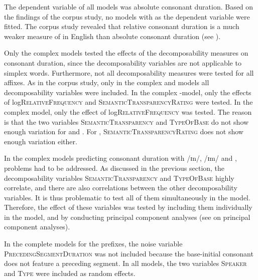 The dependent variable of all models was absolute consonant duration. Based on the findings of the corpus study, no models with  as the dependent variable were fitted.  The corpus study revealed that relative consonant duration is a much weaker measure of  in English than absolute consonant duration (see ).

Only the complex models tested the effects of the decomposability measures on consonant duration, since the decomposability variables are not applicable to simplex words.
Furthermore, not all decomposability measures were tested for all affixes. As in the corpus study, only in the complex   and models all decomposability variables were included. In the complex -model, only the effects of log\textsc{RelativeFrequency} and \textsc{SemanticTransparencyRating} were tested. In the complex model, only the effect of log\textsc{RelativeFrequency} was tested. The reason is that the two variables  \textsc{SemanticTransparency} and \textsc{TypeOfBase} do not show enough variation for  and . For , \textsc{SemanticTransparencyRating} does not show enough variation either.


In the complex models predicting consonant duration with /ɪn/, /ɪm/  and ,  problems had to be addressed. As discussed in the previous section, the decomposability variables \textsc{SemanticTransparency} and \textsc{TypeOfBase} highly correlate, and there are also correlations between the other decomposability variables. It is thus problematic to test all of them simultaneously in the model. Therefore, the effect of these variables was tested by including them individually in the model, and by conducting principal component analyses (see  on principal component analyses). 

In the complete models for the prefixes, the noise variable \textsc{PrecedingSegmentDuration} was not included because the base-initial consonant does not feature a preceding segment. In all models, the two variables \textsc{Speaker} and \textsc{Type} were included as random effects.


